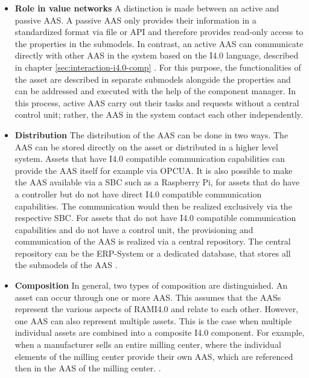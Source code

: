 \begin{itemize}
    \item [] \textbf{Role in value networks} A distinction is made between an active and passive \ac{AAS}. A passive \ac{AAS} only provides their information in a standardized format via file or \ac{API} and therefore provides read-only access to the properties in the submodels. In contrast, an active \ac{AAS} can communicate directly with other \ac{AAS} in the system based on the \ac{I4.0} language, described in chapter \ref{sec:interaction-i4.0-comp} \cite[p. 19]{Bedenbender2019VerwaltungschalePraxis}. For this purpose, the functionalities of the asset are described in separate submodels alongside the properties and can be addressed and executed with the help of the component manager. In this process, active \ac{AAS} carry out their tasks  and requests without a central control unit; rather, the \ac{AAS} in the system contact each other independently. 
    
    \item [] \textbf{Distribution} The distribution of the \ac{AAS} can be done in two ways. The \ac{AAS} can be stored directly on the asset or distributed in a higher level system. Assets that have \ac{I4.0} compatible communication capabilities can provide the \ac{AAS} itself for example via \ac{OPCUA}. It is also possible to make the \ac{AAS} available via a \ac{SBC} such as a Raspberry Pi, for assets that do have a controller but do not have direct \ac{I4.0} compatible communication capabilities. The communication would then be realized exclusively via the respective \ac{SBC}.  For assets that do not have \ac{I4.0} compatible communication capabilities and do not have a control unit, the provisioning and communication of the \ac{AAS} is realized via a central repository. The central repository can be the \ac{ERP}-System or a dedicated database, that stores all the submodels of the \ac{AAS} \cite[p. 18]{Bedenbender2019VerwaltungschalePraxis}.
    
    \item [] \textbf{Composition} In general, two types of composition are distinguished. An asset can occur through one or more \ac{AAS}. This assumes that the \ac{AAS}s represent the various aspects of \ac{RAMI4.0} and relate to each other. However, one \ac{AAS} can also represent multiple assets. This is the case when multiple individual assets are combined into a composite \ac{I4.0} component. For example, when a manufacturer sells an entire milling center, where the individual elements of the milling center provide their own \ac{AAS}, which are referenced then in the \ac{AAS} of the milling center. \cite[p. 29]{Adolphs2016StructureComponent}.
 \end{itemize}

